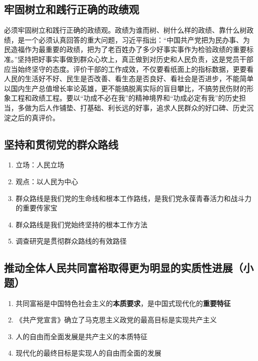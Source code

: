 \documentclass{ctexart}
\numberwithin{figure}{section}
\numberwithin{equation}{section}
\begin{document}
    \subsection{牢固树立和践行正确的政绩观}
        \begin{tcolorbox}[colback=blue!5!white]
            必须牢固树立和践行正确的政绩观。政绩为谁而树、树什么样的政绩、靠什么树政绩，是一个必须认真回答的重大问题，习近平指出：“中国共产党把为民办事、为民造福作为最重要的政绩，把为了老百姓办了多少好事实事作为检验政绩的重要标准。”坚持把好事实事做到群众心坎上，真正做到对历史和人民负责，这是党员干部应当始终坚守的态度。评价干部的工作成效，不仅要看纸面上的指标数据，更要看人民的生活好不好、民生是否改善、看生态是否良好、看社会是否进步，不能简单以国内生产总值增长率论英雄，更不能搞脱离实际的盲目攀比，不搞劳民伤财的形象工程和政绩工程。要以“功成不必在我”的精神境界和“功成必定有我”的历史担当，多做为后人作铺垫、打基础、利长远的好事，追求人民群众的好口碑、历史沉淀之后的真评价。
        \end{tcolorbox}
    \subsection{坚持和贯彻党的群众路线}
        \begin{enumerate}
            \item 立场：人民立场
            \item 观点：以人民为中心
            \item 群众路线是我们党的生命线和根本工作路线，是我们党永葆青春活力和战斗力的重要传家宝
            \item 群众路线是我们党始终坚持的根本工作方法
            \item 调查研究是贯彻群众路线的有效路径
        \end{enumerate}
    \subsection{推动全体人民共同富裕取得更为明显的实质性进展（小题）}
        \begin{enumerate}
            \item 共同富裕是中国特色社会主义的\textbf{本质要求}，是中国式现代化的\textbf{重要特征}
            \item 《共产党宣言》确立了马克思主义政党的最高目标是实现共产主义
            \item 人的自由而全面发展是共产主义的本质特征
            \item 现代化的最终目标是实现人的自由而全面的发展
        \end{enumerate}
\end{document}
